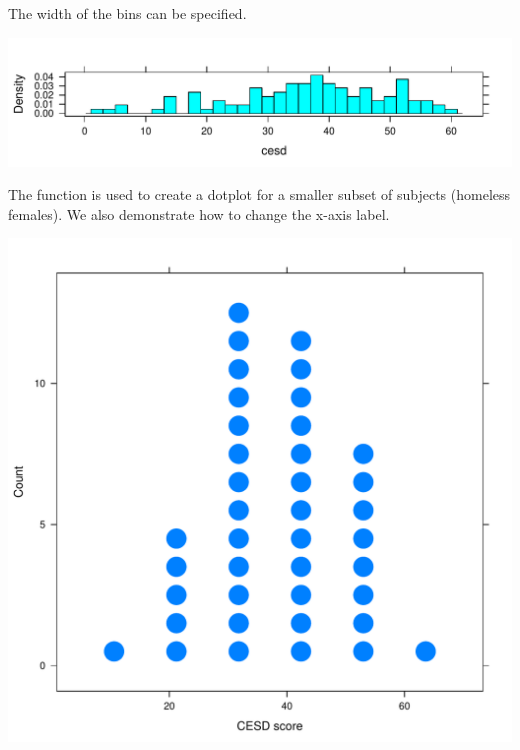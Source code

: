The width of the bins can be specified.
%
\begin{center}
\begin{knitrout}
\color{fgcolor}\begin{kframe}
\begin{alltt}
\hlstd{(}\hlopt{~}  \hlstd{=}\hlstd{,} 
\end{alltt}
\end{kframe}
\includegraphics[width=\maxwidth]{figure/cesd-dotwidth-1} 

\end{knitrout}
\end{center}

The  function is used to create a dotplot
for a smaller subset of subjects (homeless females).  We also demonstrate
how to change the x-axis label.
%
\begin{knitrout}
\color{fgcolor}\begin{kframe}
\begin{alltt}
\hlstd{(}\hlopt{~}  \hlstd{=}\hlstd{,}
  \hlstd{=}\hlopt{==}\hlstd{)} \hlopt{&} \hlopt{==}\hlstd{)))}
\end{alltt}
\end{kframe}
\includegraphics[width=\maxwidth]{figure/cesd-dot4-1} 

\end{knitrout}


